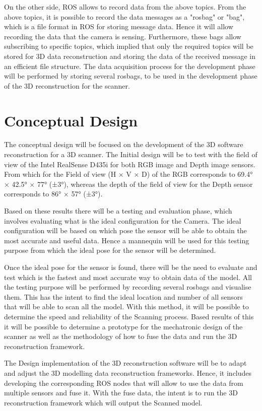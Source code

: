 \documentclass[12pt]{report}
\begin{document}
On the other side, ROS allows to record data from the above topics. From the above topics, it is possible to record the data messages as a "rosbag" or "bag", which is a file format in ROS for storing message data. Hence it will allow recording the data that the camera is sensing. 
Furthermore, these bags allow subscribing to specific topics, which implied that only the required topics will be stored for 3D data reconstruction and storing the data of the received message in an efficient file structure. 
The data acquisition process for the development phase will be performed by storing several rosbags, to be used in the development phase of the 3D reconstruction for the scanner.

\section{Conceptual Design}
The conceptual design will be focused on the development of the 3D software reconstruction for a 3D scanner. 
The Initial design will be to test with the field of view of the Intel RealSense D435i for both RGB image and Depth image sensors. From which for the Field of view (H × V × D) of the RGB corresponds to 69.4° × 42.5° × 77° (±3°),
whereas the depth of the field of view for the Depth sensor corresponds to 86° × 57° (±3°)\citep*{intelrealsense}.

Based on these results there will be a testing and evaluation phase, which involves evaluating what is the ideal configuration for the Camera. The ideal configuration will be based on which pose the sensor will be able to obtain the most accurate and useful data. 
Hence a mannequin will be used for this testing purpose from which the ideal pose for the sensor will be determined. 

Once the ideal pose for the sensor is found, there will be the need to evaluate and test which is the fastest and most accurate way to obtain data of the model. All the testing purpose will be performed by recording several rosbags and visualise them.
This has the intent to find the ideal location and number of all sensors that will be able to scan all the model. With this method, it will be possible to determine the speed and reliability of the Scanning process. 
Based results of this it will be possible to determine a prototype for the mechatronic design of the scanner as well as the methodology of how to fuse the data and run the 3D reconstruction framework. 

The Design implementation of the 3D reconstruction software will be to adapt and adjust the 3D modelling data reconstruction frameworks. Hence, it includes developing the corresponding ROS nodes that will allow to use the data from multiple sensors and fuse it. 
With the fuse data, the intent is to run the 3D reconstruction framework which will output the Scanned model. 
\end{document}

